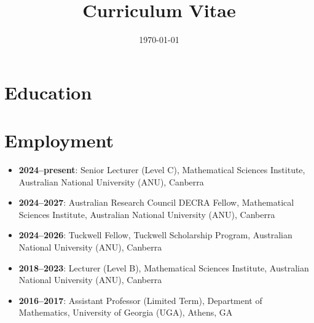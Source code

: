 \documentclass[a4paper]{moderncv}
\date{\today}
\title{Curriculum Vitae}
\begin{document}
\maketitle

\section*{Education}
\label{sec:org8832c47}

\section*{Employment}
\label{sec:org2acf4d5}
\begin{itemize}
\item \textbf{2024--present}: Senior Lecturer (Level C), Mathematical Sciences Institute, Australian National University (ANU), Canberra
\item \textbf{2024--2027}: Australian Research Council DECRA Fellow, Mathematical Sciences Institute, Australian National University (ANU), Canberra
\item \textbf{2024--2026}: Tuckwell Fellow, Tuckwell Scholarship Program, Australian National University (ANU), Canberra
\item \textbf{2018--2023}: Lecturer (Level B), Mathematical Sciences Institute, Australian National University (ANU), Canberra
\item \textbf{2016--2017}: Assistant Professor (Limited Term), Department of Mathematics, University of Georgia (UGA), Athens, GA
\end{itemize}
\end{document}
